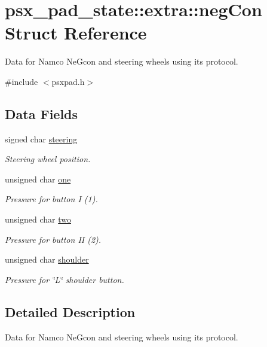\hypertarget{structpsx__pad__state_1_1extra_1_1negCon}{}\section{psx\+\_\+pad\+\_\+state\+:\+:extra\+:\+:neg\+Con Struct Reference}
\label{structpsx__pad__state_1_1extra_1_1negCon}


Data for Namco Ne\+Gcon and steering wheels using its protocol.  




{\ttfamily \#include $<$psxpad.\+h$>$}

\subsection*{Data Fields}
\begin{DoxyCompactItemize}
\item 
signed char \hyperlink{structpsx__pad__state_1_1extra_1_1negCon_a2b80fffb7562cb5e49a27b39abf6d801}{steering}
\begin{DoxyCompactList}\small\item\em Steering wheel position. \end{DoxyCompactList}\item 
unsigned char \hyperlink{structpsx__pad__state_1_1extra_1_1negCon_ab92a6ae63fc0da597e8c07ad393d6d44}{one}
\begin{DoxyCompactList}\small\item\em Pressure for button I (1). \end{DoxyCompactList}\item 
unsigned char \hyperlink{structpsx__pad__state_1_1extra_1_1negCon_a10c325e774816864fcff176eeb29ba41}{two}
\begin{DoxyCompactList}\small\item\em Pressure for button I\+I (2). \end{DoxyCompactList}\item 
unsigned char \hyperlink{structpsx__pad__state_1_1extra_1_1negCon_aaf8cb3aec1ced04942adaca02b55e7a4}{shoulder}
\begin{DoxyCompactList}\small\item\em Pressure for \char`\"{}\+L\char`\"{} shoulder button. \end{DoxyCompactList}\end{DoxyCompactItemize}


\subsection{Detailed Description}
Data for Namco Ne\+Gcon and steering wheels using its protocol. 

